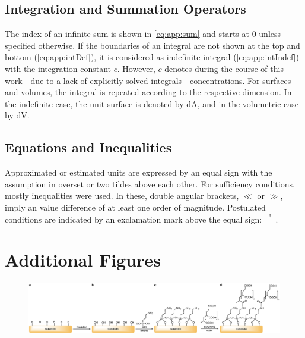 \subsection{Integration and Summation Operators}
The index of an infinite sum is shown in \cref{eq:app:sum}  and starts at \num{0} unless specified otherwise. If the boundaries of an integral are not shown at the top and bottom (\cref{eq:app:intDef}), it is considered as indefinite integral (\cref{eq:app:intIndef}) with the integration constant $c$. However, $c$ denotes during the course of this work - due to a lack of explicitly solved integrals - concentrations.
For surfaces and volumes, the integral is repeated according to the respective dimension. In the indefinite case, the unit surface is denoted by $\mathrm{dA}$, and in the volumetric case by $\mathrm{dV}$. 

\subsection{Equations and Inequalities}
Approximated or estimated units are expressed by an equal sign with the assumption in overset or two tildes above each other. For sufficiency conditions, mostly inequalities were used. In these, double angular brackets, $\ll$ or $\gg$, imply an value difference of at least one order of magnitude. Postulated conditions are indicated by an exclamation mark above the equal sign: $\overset{!}{=}$.

\clearpage
\section{Additional Figures}

\begin{figure}[h!]
	\centering
	\includegraphics[width=1\linewidth]{Ressources/Chemistry/Substrate}
	\label{fig:chem:func:withPAA}
\end{figure}

